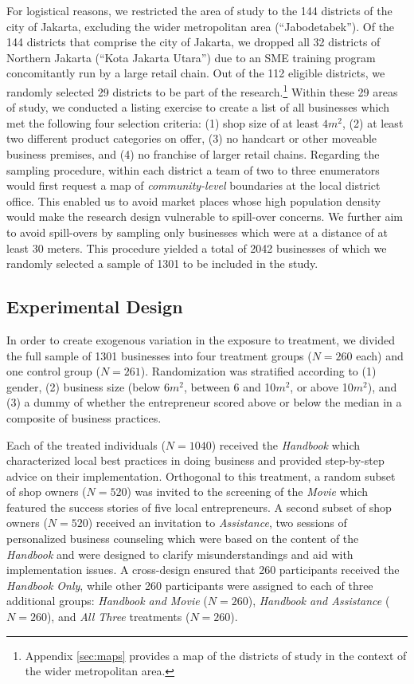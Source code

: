 \documentclass[11.5pt]{article}
\begin{document}
For logistical reasons, we restricted the area of study to the 144 districts of the city of Jakarta, excluding the wider metropolitan area (``Jabodetabek''). Of the 144 districts that comprise the city of Jakarta, we dropped all 32 districts of Northern Jakarta (``Kota Jakarta Utara'') due to an SME training program concomitantly run by a large retail chain. Out of the 112 eligible districts, we randomly selected 29 districts to be part of the research.\footnote{Appendix \ref{sec:maps} provides a map of the districts of study in the context of the wider metropolitan area.} Within these 29 areas of study, we conducted a listing exercise to create a list of all businesses which met the following four selection criteria: (1) shop size of at least $4m^2$, (2) at least two different product categories on offer, %
(3) no handcart or other moveable business premises, and (4) no franchise of larger retail chains. Regarding the sampling procedure, within each district a team of two to three enumerators would first request a map of \textit{community-level} boundaries at the local district office. This enabled us to avoid market places whose high population density would make the research design vulnerable to spill-over concerns. We further aim to avoid spill-overs by sampling only businesses which were at a distance of at least 30 meters. This procedure yielded a total of 2042 businesses of which we randomly selected a sample of 1301 to be included in the study.


\subsection{Experimental Design}

In order to create exogenous variation in the exposure to treatment, we divided the full sample of 1301 businesses into four treatment groups ($N = 260$ each) and one control group ($N = 261$). Randomization was stratified according to (1) gender, (2) business size (below 6$m^2$, between 6 and 10$m^2$, or above 10$m^2$), and (3) a dummy of whether the entrepreneur scored above or below the median in a composite of business practices.

Each of the treated individuals ($N = 1040$) received the \emph{Handbook} which characterized local best practices in doing business and provided step-by-step advice on their implementation. Orthogonal to this treatment, a random subset of shop owners ($N = 520$) was invited to the screening of the \emph{Movie} which featured the success stories of five local entrepreneurs. A second subset of shop owners ($N = 520$) received an invitation to \emph{Assistance}, two sessions of personalized business counseling which were based on the content of the \emph{Handbook} and were designed to clarify misunderstandings and aid with implementation issues. A cross-design ensured that 260 participants received the \emph{Handbook Only}, while other 260 participants were assigned to each of three additional groups: \emph{Handbook and Movie} ($N = 260$), \emph{Handbook and Assistance} ($N = 260$), and \emph{All Three} treatments ($N = 260$).
\end{document}
